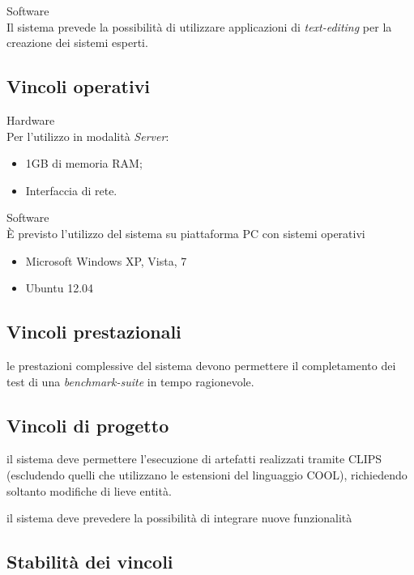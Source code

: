 	\item Software\\
	Il sistema prevede la possibilità di utilizzare applicazioni di \emph{text-editing} per la creazione dei sistemi esperti.
	
\vincoliend

\subsection{Vincoli operativi}

\vincolistart
	\item Hardware\\
	Per l'utilizzo in modalità \emph{Server}:
	\begin{itemize}
		\item 1GB di memoria RAM;
		\item Interfaccia di rete.
	\end{itemize}
	\item Software\\
	\`E previsto l'utilizzo del sistema su piattaforma PC con sistemi operativi
	\begin{itemize}
		\item Microsoft Windows XP, Vista, 7
		\item Ubuntu 12.04
	\end{itemize}
\vincoliend

\subsection{Vincoli prestazionali}
\vincolistart
	\item le prestazioni complessive del sistema devono permettere il completamento dei test di una \emph{benchmark-suite} in tempo ragionevole.
\vincoliend
\subsection{Vincoli di progetto}
\vincolistart
	\item il sistema deve permettere l'esecuzione di artefatti realizzati tramite CLIPS (escludendo quelli che utilizzano le estensioni del linguaggio COOL), richiedendo soltanto modifiche di lieve entità.
	
	\item il sistema deve prevedere la possibilità di integrare nuove funzionalità
\vincoliend

\subsection{Stabilità dei vincoli}

